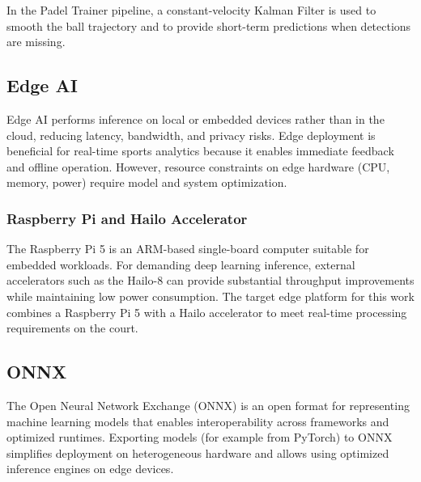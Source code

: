 In the Padel Trainer pipeline, a constant-velocity Kalman Filter is used to smooth the ball trajectory and to provide short-term predictions when detections are missing.

\subsection{Edge AI}

Edge AI performs inference on local or embedded devices rather than in the cloud, reducing latency, bandwidth, and privacy risks. Edge deployment is beneficial for real-time sports analytics because it enables immediate feedback and offline operation. However, resource constraints on edge hardware (CPU, memory, power) require model and system optimization.

\subsubsection{Raspberry Pi and Hailo Accelerator}

The Raspberry Pi 5 is an ARM-based single-board computer suitable for embedded workloads. For demanding deep learning inference, external accelerators such as the Hailo-8 can provide substantial throughput improvements while maintaining low power consumption. The target edge platform for this work combines a Raspberry Pi 5 with a Hailo accelerator to meet real-time processing requirements on the court.

\subsection{ONNX}

The Open Neural Network Exchange (ONNX) is an open format for representing machine learning models that enables interoperability across frameworks and optimized runtimes. Exporting models (for example from PyTorch) to ONNX simplifies deployment on heterogeneous hardware and allows using optimized inference engines on edge devices.